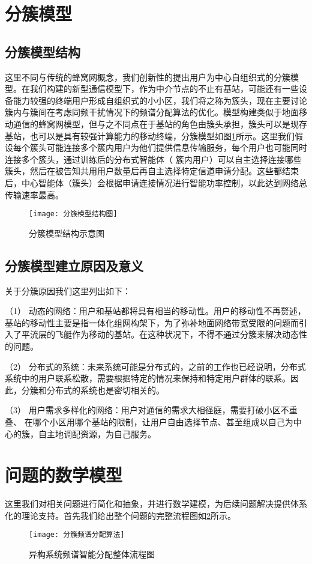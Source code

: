 \section{分簇模型}
\subsection{分簇模型结构}
这里不同与传统的蜂窝网概念，我们创新性的提出用户为中心自组织式的分簇模型。在我们构建的新型通信模型下，作为中介节点的不止有基站，可能还有一些设备能力较强的终端用户形成自组织式的小小区，我们将之称为簇头，现在主要讨论簇内与簇间在考虑同频干扰情况下的频谱分配算法的优化。模型构建类似于地面移动通信的蜂窝网模型，但与之不同点在于基站的角色由簇头承担，簇头可以是现存基站，也可以是具有较强计算能力的移动终端，分簇模型如图\ref{fig:分簇模型结构图}所示。这里我们假设每个簇头可能连接多个簇内用户为他们提供信息传输服务，每个用户也可能同时连接多个簇头，通过训练后的分布式智能体（ 簇内用户）可以自主选择连接哪些簇头，然后在被告知共用用户数量后再自主选择特定信道申请分配。这些都结束后，中心智能体（簇头）会根据申请连接情况进行智能功率控制，以此达到网络总传输速率最高。
\begin{figure}[h]
	\centering
	\texttt{[image: 分簇模型结构图]}
	\caption{分簇模型结构示意图}
	\label{fig:分簇模型结构图}
\end{figure}

\subsection{分簇模型建立原因及意义}
关于分簇原因我们这里列出如下：

（1） 动态的网络：用户和基站都将具有相当的移动性。用户的移动性不再赘述，基站的移动性主要是指一体化组网构架下，为了弥补地面网络带宽受限的问题而引入了平流层的飞艇作为移动的基站。在这种状况下，不得不通过分簇来解决动态性的问题。

（2） 分布式的系统：未来系统可能是分布式的，之前的工作也已经说明，分布式系统中的用户联系松散，需要根据特定的情况来保持和特定用户群体的联系。因此，分簇和分布式的系统也是密切相关的。

（3） 用户需求多样化的网络：用户对通信的需求大相径庭，需要打破小区不重叠、 在哪个小区用哪个基站的限制，让用户自由选择节点、甚至组成以自己为中心的簇，自主地调配资源，为自己服务。

\section{问题的数学模型}
这里我们对相关问题进行简化和抽象，并进行数学建模，为后续问题解决提供体系化的理论支持。首先我们给出整个问题的完整流程图如\ref{fig：整体流程图}所示。
\begin{figure}[htbp]
	\centering
	\texttt{[image: 分簇频谱分配算法]}
	\caption{异构系统频谱智能分配整体流程图}
	\label{fig：整体流程图}
\end{figure}

